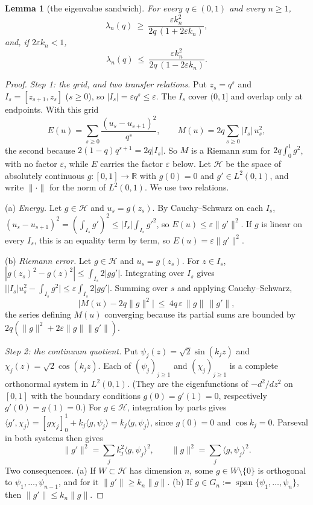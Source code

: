 \documentclass[11pt]{article}
\theoremstyle{plain}
\newtheorem{lemma}[theorem]{Lemma}
\theoremstyle{definition}
\theoremstyle{remark}
\newcommand{\R}{\mathbb{R}}
\begin{document}
\begin{lemma}[the eigenvalue sandwich]\label{lem:sandwich}
For every $q\in(0,1)$ and every $n\ge1$,
\[
   \lambda_n(q)\ \ge\ \frac{\varepsilon k_n^2}{2q\,(1+2\varepsilon k_n)} ,
\]
and, if $2\varepsilon k_n<1$,
\[
   \lambda_n(q)\ \le\ \frac{\varepsilon k_n^2}{2q\,(1-2\varepsilon k_n)} .
\]
\end{lemma}

\begin{proof}
\emph{Step 1: the grid, and two transfer relations.} Put $z_s=q^s$ and $I_s=[z_{s+1},z_s]$
($s\ge0$), so $|I_s|=\varepsilon q^s\le\varepsilon$. The $I_s$ cover $(0,1]$ and overlap only at
endpoints. With this grid
\[
   E(u)=\sum_{s\ge0}\frac{(u_s-u_{s+1})^2}{q^s},\qquad
   M(u)=2q\sum_{s\ge0}|I_s|\,u_s^2 ,
\]
the second because $2(1-q)q^{s+1}=2q|I_s|$. So $M$ is a Riemann sum for $2q\int_0^1g^2$, with no
factor $\varepsilon$, while $E$ carries the factor $\varepsilon$ below. Let $\mathcal H$ be the space
of absolutely continuous $g:[0,1]\to\R$ with $g(0)=0$ and $g'\in L^2(0,1)$, and write
$\|\cdot\|$ for the norm of $L^2(0,1)$. We use two relations.

(a) \emph{Energy.} Let $g\in\mathcal H$ and $u_s=g(z_s)$. By Cauchy--Schwarz on each $I_s$,
$(u_s-u_{s+1})^2=(\int_{I_s}g')^2\le|I_s|\int_{I_s}g'^2$, so $E(u)\le\varepsilon\|g'\|^2$. If $g$ is
linear on every $I_s$, this is an equality term by term, so $E(u)=\varepsilon\|g'\|^2$.

(b) \emph{Riemann error.} Let $g\in\mathcal H$ and $u_s=g(z_s)$. For $z\in I_s$,
$|g(z_s)^2-g(z)^2|\le\int_{I_s}2|gg'|$. Integrating over $I_s$ gives
$\bigl||I_s|u_s^2-\int_{I_s}g^2\bigr|\le\varepsilon\int_{I_s}2|gg'|$. Summing over $s$ and applying
Cauchy--Schwarz,
\[
   \bigl|M(u)-2q\|g\|^2\bigr|\ \le\ 4q\,\varepsilon\,\|g\|\,\|g'\| ,
\]
the series defining $M(u)$ converging because its partial sums are bounded by
$2q(\|g\|^2+2\varepsilon\|g\|\|g'\|)$.

\emph{Step 2: the continuum quotient.} Put $\psi_j(z)=\sqrt2\sin(k_jz)$ and
$\chi_j(z)=\sqrt2\cos(k_jz)$. Each of $(\psi_j)_{j\ge1}$ and $(\chi_j)_{j\ge1}$ is a complete
orthonormal system in $L^2(0,1)$. (They are the eigenfunctions of $-d^2/dz^2$ on $[0,1]$ with the
boundary conditions $g(0)=g'(1)=0$, respectively $g'(0)=g(1)=0$.) For $g\in\mathcal H$, integration by
parts gives $\langle g',\chi_j\rangle=[g\chi_j]_0^1+k_j\langle g,\psi_j\rangle=k_j\langle
g,\psi_j\rangle$, since $g(0)=0$ and $\cos k_j=0$. Parseval in both systems then gives
\[
   \|g'\|^2=\sum_jk_j^2\langle g,\psi_j\rangle^2,\qquad \|g\|^2=\sum_j\langle g,\psi_j\rangle^2 .
\]
Two consequences. (a) If $W\subset\mathcal H$ has dimension $n$, some $g\in W\setminus\{0\}$ is
orthogonal to $\psi_1,\dots,\psi_{n-1}$, and for it $\|g'\|\ge k_n\|g\|$. (b) If
$g\in G_n:=\operatorname{span}\{\psi_1,\dots,\psi_n\}$, then $\|g'\|\le k_n\|g\|$.


\end{proof}
\end{document}

